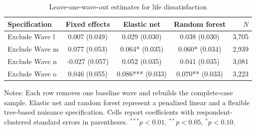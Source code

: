 \begin{table}[!htbp]
\centering
\caption{Leave-one-wave-out estimates for life dissatisfaction}
\label{tab:robustness_leave_one_wave_out}
\small
\setlength{\tabcolsep}{4pt}
\begin{tabular}{lcccr}
\hline
Specification & Fixed effects & Elastic net & Random forest & $N$
\\
\hline
Exclude Wave l & 0.007 (0.049) & 0.029 (0.030) & 0.038 (0.030) & 3,705
\\
Exclude Wave m & 0.077 (0.053) & 0.064* (0.035) & 0.060* (0.034) & 2,939
\\
Exclude Wave n & -0.027 (0.057) & 0.052 (0.035) & 0.041 (0.035) & 3,081
\\
Exclude Wave o & 0.046 (0.055) & 0.086*** (0.033) & 0.070** (0.033) & 3,223
\\
\hline
\end{tabular}
\begin{minipage}{0.97\textwidth}
\footnotesize Notes: Each row removes one baseline wave and rebuilds the complete-case sample. Elastic net and random forest represent a penalized linear and a flexible tree-based nuisance specification. Cells report coefficients with respondent-clustered standard errors in parentheses. $^{***}p<0.01$, $^{**}p<0.05$, $^{*}p<0.10$.
\end{minipage}
\end{table}
